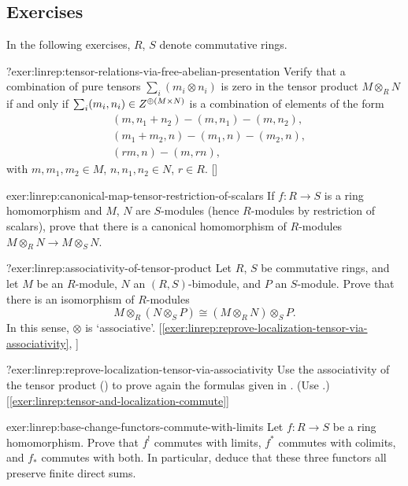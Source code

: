 \subsection*{Exercises}

In the following exercises, $R$, $S$ denote commutative rings.

\begin{exer}{$?$}{exer:linrep:tensor-relations-via-free-abelian-presentation}
  Verify that a combination of pure tensors $\sum_i (m_i \otimes n_i)$
  is zero in the tensor product $M \otimes_R N$ if and only if
  $\sum_i (m_i, n_i) \in Z^{\oplus(M \times N)}$ is a combination of
  elements of the form
  \begin{align*}
    &(m, n_1 + n_2) - (m, n_1) - (m, n_2), \\
    &(m_1 + m_2, n) - (m_1, n) - (m_2, n), \\
    &(rm, n) - (m, rn),
  \end{align*}
  with $m, m_1, m_2 \in M$, $n, n_1, n_2 \in N$, $r \in R$.
  []
\end{exer}
\begin{exer}{}{exer:linrep:canonical-map-tensor-restriction-of-scalars}
  If $f : R \to S$ is a ring homomorphism and $M$, $N$ are $S$-modules
  (hence $R$-modules by restriction of scalars), prove that there is a
  canonical homomorphism of $R$-modules
  $M \otimes_R N \to M \otimes_S N$.
\end{exer}
\begin{exer}{$?$}{exer:linrep:associativity-of-tensor-product}
  Let $R$, $S$ be commutative rings, and let $M$ be an $R$-module, $N$
  an $(R,S)$-bimodule, and $P$ an $S$-module. Prove that there is an
  isomorphism of $R$-modules
  \[
    M \otimes_R (N \otimes_S P) \cong (M \otimes_R N) \otimes_S P.
  \]
  In this sense, $\otimes$ is
  `associative'. [\ref{exer:linrep:reprove-localization-tensor-via-associativity},
  ]
\end{exer}
\begin{exer}{$?$}{exer:linrep:reprove-localization-tensor-via-associativity}
  Use the associativity of the tensor product
  () to
  prove again the formulas given in
  . (Use
  .)
  [\ref{exer:linrep:tensor-and-localization-commute}]
\end{exer}
\begin{exer}{}{exer:linrep:base-change-functors-commute-with-limits}
  Let $f : R \to S$ be a ring homomorphism. Prove that $f^!$ commutes
  with limits, $f^*$ commutes with colimits, and $f_*$ commutes with
  both. In particular, deduce that these three functors all preserve
  finite direct sums.
\end{exer}
